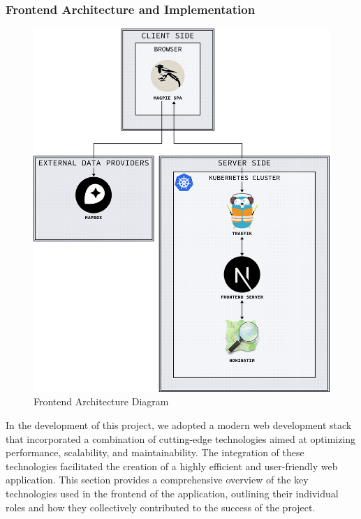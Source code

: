 \subsubsection{Frontend Architecture and Implementation}

\newpage{}

\begin{figure}[htbp]
  \centering{}
  \includegraphics[width=\columnwidth]{../d2-diagrams/system-diagram/system-diagram-frontend.png}
  \caption{Frontend Architecture Diagram}
  \label{fig:arcgis}
\end{figure}

\newpage{}

In the development of this project, we adopted a modern web development stack
that incorporated a combination of cutting{-}edge technologies aimed at
optimizing performance, scalability, and maintainability. The integration of
these technologies facilitated the creation of a highly efficient and
user{-}friendly web application. This section provides a comprehensive overview
of the key technologies used in the frontend of the application, outlining their
individual roles and how they collectively contributed to the success of the
project.

